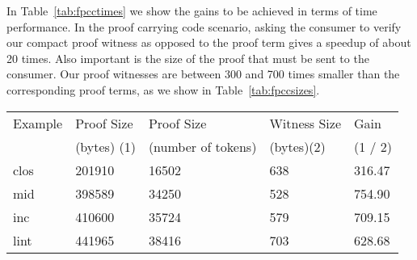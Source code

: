 \documentclass{llncs}
\begin{document}
In Table~\ref{tab:fpcctimes} we show the gains to be achieved in terms of
time performance. In the proof carrying code scenario, asking the consumer
to verify our compact proof witness as opposed to the proof term gives a 
speedup of about 20 times. Also important is the size of the proof that
must be sent to the consumer. Our proof witnesses are between 300 and 700
times smaller than the corresponding proof terms, as we show in
Table~\ref{tab:fpccsizes}.

\begin{table*}[htbp]
\begin{center}
\begin{small}
\begin{tabular}{|l|l|l|l|l|}
\hline
Example & Proof Size & Proof Size & Witness Size & Gain \\
& (bytes) (1) & (number of tokens) & (bytes)(2) & (1 / 2)\\
\hline
clos & 201910 & 16502 & 638 & 316.47\\
mid & 398589 & 34250 & 528 & 754.90\\
inc & 410600 & 35724 & 579 & 709.15\\
lint & 441965 & 38416 & 703 & 628.68\\
\hline
\end{tabular}
\end{small}
\end{center}
\caption{\label{tab:fpccsizes}
FPCC: Sizes without Caching}
\end{table*}
\end{document}
